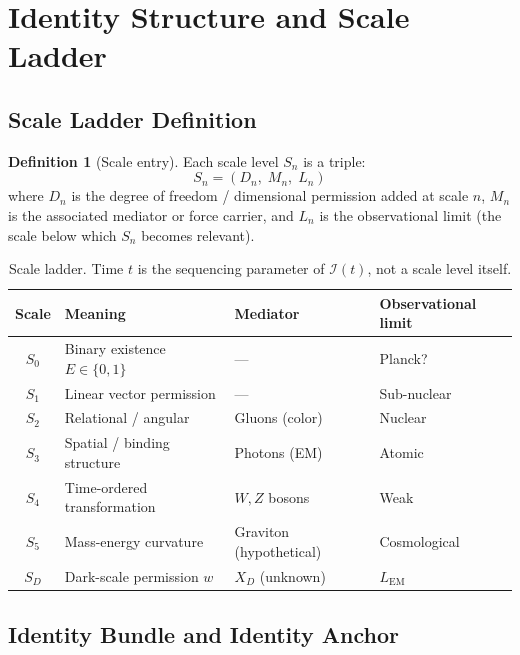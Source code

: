\documentclass[11pt, a4paper, oneside]{article}
\theoremstyle{definition}
\newtheorem{definition}{Definition}[section]
\theoremstyle{plain}
\theoremstyle{remark}
\begin{document}
\section{Identity Structure and Scale Ladder}

\subsection{Scale Ladder Definition}

\begin{definition}[Scale entry]
  Each scale level $S_n$ is a triple:
  \begin{equation}
	S_n = (D_n,\; M_n,\; L_n)
  \end{equation}
  where $D_n$ is the degree of freedom / dimensional permission added at
  scale $n$, $M_n$ is the associated mediator or force carrier, and $L_n$
  is the observational limit (the scale below which $S_n$ becomes relevant).
\end{definition}

\begin{table}[h]
  \centering
  \begin{tabularx}{\linewidth}{c l l l}
	\toprule
	Scale & Meaning & Mediator & Observational limit \\
	\midrule
	$S_0$ & Binary existence $E \in \{0,1\}$ & --- & Planck? \\
	$S_1$ & Linear vector permission & --- & Sub-nuclear \\
	$S_2$ & Relational / angular & Gluons (color) & Nuclear \\
	$S_3$ & Spatial / binding structure & Photons (EM) & Atomic \\
	$S_4$ & Time-ordered transformation & $W, Z$ bosons & Weak \\
	$S_5$ & Mass-energy curvature & Graviton (hypothetical) & Cosmological \\
	$S_D$ & Dark-scale permission $w$ & $X_D$ (unknown) & $L_\text{EM}$ \\
	\bottomrule
  \end{tabularx}
  \caption{Scale ladder. Time $t$ is the sequencing parameter of
  $\mathcal{I}(t)$, not a scale level itself.}
  \label{tab:scale-ladder}
\end{table}

\subsection{Identity Bundle and Identity Anchor}
\end{document}
